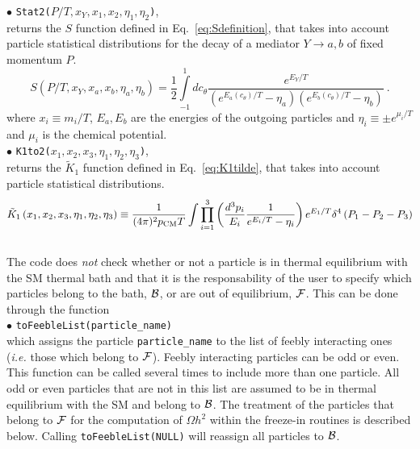 \documentclass[12pt,a4paper]{article}
\begin{document}
\noindent
$\bullet$ \verb|Stat2(|$P/T,x_Y,x_1,x_2,\eta_1,\eta_2$\verb|)|,\\
 returns the $S$ function defined in Eq.~\eqref{eq:Sdefinition}, that takes into account particle statistical distributions for the decay of a mediator $Y \rightarrow a,b$ of fixed momentum $P$. 
\begin{equation}\label{eq:Sdefinition}
S\left( P/T, x_Y, x_a, x_b, \eta_a, \eta_b \right)= \frac{1}{2}\int\limits_{-1}^{1} dc_{\theta}
\frac{e^{E_Y/T}}{(e^{E_a(c_\theta)/T} - \eta_a)(e^{E_b(c_\theta)/T} - \eta_b)}\ .
\end{equation}
where $x_i \equiv m_i/T$, $E_a,E_b$ are the energies of the outgoing particles and $\eta_i \equiv \pm e^{\mu_i/T}$ and $\mu_i$ is the chemical potential.\\

\noindent$ \bullet$ \verb|K1to2(|$x_1,x_2,x_3,\eta_1,\eta_2,\eta_3$\verb|)|,\\
 returns the $\tilde{K}_1$ function defined in Eq.~\eqref{eq:K1tilde}, that takes into account particle statistical distributions.  
 \begin{equation}\label{eq:K1tilde}
\tilde K_1 \left( x_1, x_2, x_3, \eta_1, \eta_2, \eta_3 \right)  \equiv
\frac{1}{(4\pi)^2 p_{\rm CM} T} \int \prod\limits_{i=1}^{3} \left( \frac{d^3 p_i}{E_i} \frac{1}{e^{E_i/T} - \eta_i} \right) e^{E_1/T} \delta^4 \left( P_1 - P_2 - P_3 \right) 
\end{equation}
\\
The code does \textit{not} check whether or not a particle is in thermal equilibrium with the SM thermal bath and that it is the responsability of the user to specify which particles belong to the bath, ${\cal B}$, or are out of equilibrium, ${\cal F}$. This can be done through the function\\
\noindent
$\bullet$ \verb|toFeebleList(particle_name)|\\
which assigns the particle \verb|particle_name| to the list of feebly interacting ones (\textit{i.e.} those which belong to ${\cal F}$). Feebly interacting particles can be odd or even.   
This function can be called several times to include more than one particle.  All  odd or even particles that are not in this list are assumed to be in thermal equilibrium with the SM and belong to ${\cal B}$. 
The treatment of the particles that belong to  ${\cal F}$ for the computation of $\Omega h^2$ within the freeze-in routines is described below. 
Calling \verb|toFeebleList(NULL)| will reassign all particles to ${\cal B}$.\\
\end{document}
